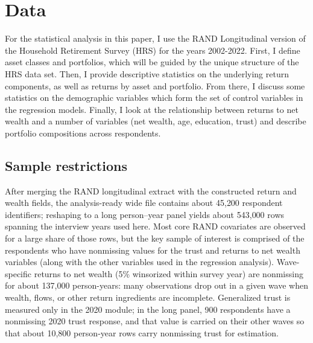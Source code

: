 \onlyinsubfile{\setcounter{section}{2}}

\section{Data}
\label{sec:data}

\par For the statistical analysis in this paper, I use the RAND Longitudinal version of the Household Retirement Survey (HRS) for the years 2002-2022. First, I define asset classes and portfolios, which will be guided by the unique structure of the HRS data set. Then, I provide descriptive statistics on the underlying return components, as well as returns by asset and portfolio. From there, I discuss some statistics on the demographic variables which form the set of control variables in the regression models. Finally, I look at the relationship between returns to net wealth and a number of variables (net wealth, age, education, trust) and describe portfolio compositions across respondents.

\subsection{Sample restrictions}
\label{ssec:sample-restrictions}

\par After merging the RAND longitudinal extract with the constructed return and wealth fields, the analysis-ready wide file contains about 45{,}200 respondent identifiers; reshaping to a long person--year panel yields about 543{,}000 rows spanning the interview years used here. Most core RAND covariates are observed for a large share of those rows, but the key sample of interest is comprised of the respondents who have nonmissing values for the trust and returns to net wealth variables (along with the other variables used in the regression analysis). Wave-specific returns to net wealth (5\% winsorized within survey year) are nonmissing for about 137{,}000 person-years: many observations drop out in a given wave when wealth, flows, or other return ingredients are incomplete. Generalized trust is measured only in the 2020 module; in the long panel, 900 respondents have a nonmissing 2020 trust response, and that value is carried on their other waves so that about 10{,}800 person-year rows carry nonmissing trust for estimation.

